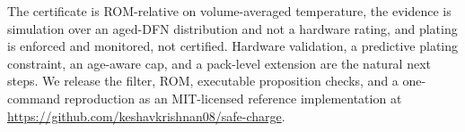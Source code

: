 \documentclass[conference]{IEEEtran}
\begin{document}
The certificate is ROM-relative on volume-averaged temperature, the
evidence is simulation over an aged-DFN distribution and not a hardware rating, and plating is enforced
and monitored, not certified. Hardware validation, a predictive plating constraint, an age-aware cap,
and a pack-level extension are the natural next steps. We release the filter, ROM, executable
proposition checks, and a one-command reproduction as an MIT-licensed reference implementation at
\url{https://github.com/keshavkrishnan08/safe-charge}.



\end{document}
